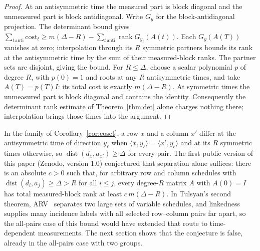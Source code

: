 \documentclass[11pt]{article}
\newcommand{\rank}{\operatorname{rank}}
\newcommand{\dist}{\operatorname{dist}}
\begin{document}
\begin{proof}
At an antisymmetric time the measured part is block diagonal and the unmeasured part is block antidiagonal. Write $G_y$ for the block-antidiagonal projection. The determinant bound gives $\sum_{t\,\mathrm{anti}}\mathrm{cost}_t\ge m(\Delta-R)-\sum_{t\,\mathrm{anti}}\rank G_{y_t}(A(t))$. Each $G_y(A(T))$ vanishes at zero; interpolation through its $R$ symmetric partners bounds its rank at the antisymmetric time by the sum of their measured-block ranks. The partner sets are disjoint, giving the bound. For $R\le\Delta$, choose a scalar polynomial $p$ of degree $R$, with $p(0)=1$ and roots at any $R$ antisymmetric times, and take $A(T)=p(T)I$: its total cost is exactly $m(\Delta-R)$. At symmetric times the unmeasured part is block diagonal and contains the identity. Consequently the determinant rank estimate of Theorem~\ref{thm:det} alone charges nothing there; interpolation brings those times into the argument.
\end{proof}
In the family of Corollary~\ref{cor:coset}, a row $x$ and a column $x'$ differ at the antisymmetric time of direction $y_\ell$ when $\langle x,y_\ell\rangle=\langle x',y_\ell\rangle$ and at its $R$ symmetric times otherwise, so $\dist(d_x,a_{x'})\ge\Delta$ for every pair. The first public version of this paper (Zenodo, version 1.0) conjectured that separation alone suffices: there is an absolute $c>0$ such that, for arbitrary row and column schedules with $\dist(d_i,a_j)\ge\Delta>R$ for all $i\le j$, every degree-$R$ matrix $A$ with $A(0)=I$ has total measured-block rank at least $c\,m(\Delta-R)$. In Tulsyan's second theorem, ARV~\cite{arv} separates two large sets of variable schedules, and linkedness supplies many incidence labels with all selected row--column pairs far apart, so the all-pairs case of this bound would have extended that route to time-dependent measurements. The next section shows that the conjecture is false, already in the all-pairs case with two groups.
\end{document}
